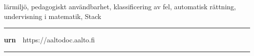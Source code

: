 \begin{spacing}{.88}
{\parindent0pt %

\parbox[t]{121.6mm}{\raggedright\small lärmiljö, pedagogiskt användbarhet, klassificering av fel, automatisk rättning, undervisning i matematik, Stack}

\vspace{.5mm}\rule{\textwidth}{.75pt}

{\fontsize{10.5pt}{10.5pt}\bfseries\sffamily\lsstyle urn}~~{\small https://aaltodoc.aalto.fi}

\vspace{-2.4mm}\rule{\textwidth}{.75pt}

} %
\end{spacing}




\newpage
{}
{}


